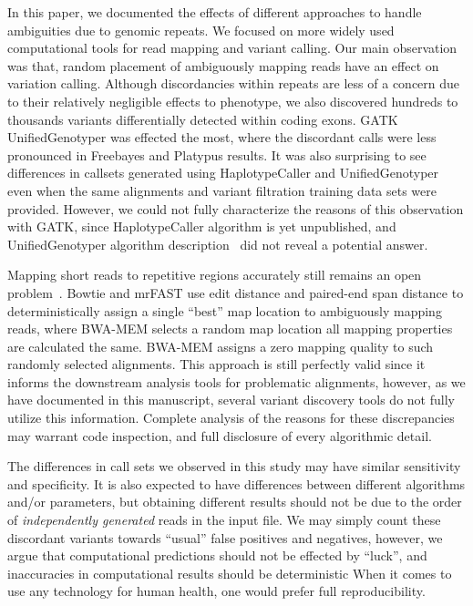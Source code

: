 \documentclass[10pt,a4paper]{article}
\begin{document}
In this paper, we documented the effects of different approaches to handle ambiguities due to genomic repeats. We focused on more widely used computational tools for read mapping and variant calling. Our main observation was that, random placement of ambiguously mapping reads have an effect on variation calling. Although discordancies within repeats are less of a concern due to their relatively negligible 
effects to phenotype, we also discovered hundreds to thousands variants differentially detected within coding exons. GATK UnifiedGenotyper was effected the most, where the discordant calls were less pronounced in Freebayes and Platypus results. It was also surprising to see differences in callsets generated using HaplotypeCaller and UnifiedGenotyper even when the same alignments and variant filtration training data sets were provided. However, we could not fully characterize the reasons
of this observation with GATK, since HaplotypeCaller algorithm is yet unpublished, and UnifiedGenotyper algorithm description~\cite{DePristo2011} did not reveal a potential answer. 

Mapping short reads to repetitive regions accurately still remains an open problem~\cite{Treangen2012}. Bowtie and mrFAST use edit distance and paired-end span distance to deterministically assign a single ``best'' map location to ambiguously mapping reads, where BWA-MEM selects a random map location all mapping properties are calculated the same. BWA-MEM assigns a zero mapping quality
to such randomly selected alignments. This approach is still perfectly valid since it informs the downstream analysis tools for problematic alignments, however, as we have documented in this manuscript, 
several variant discovery tools do not fully utilize this information. Complete analysis of the reasons for these discrepancies may warrant code inspection, and full disclosure of every algorithmic detail.

The differences in call sets we observed in this study 
may have similar sensitivity and specificity.
It is also expected to
have differences between different algorithms and/or parameters, but
obtaining different results should not be due to the order of {\it independently generated} reads in the input file. 
We may simply count these discordant variants towards ``usual'' false positives and negatives, however, 
we argue that computational predictions should not be effected by ``luck'', and inaccuracies in computational results should be deterministic
When it comes to use any technology for human health, one would prefer full reproducibility. 
\end{document}
